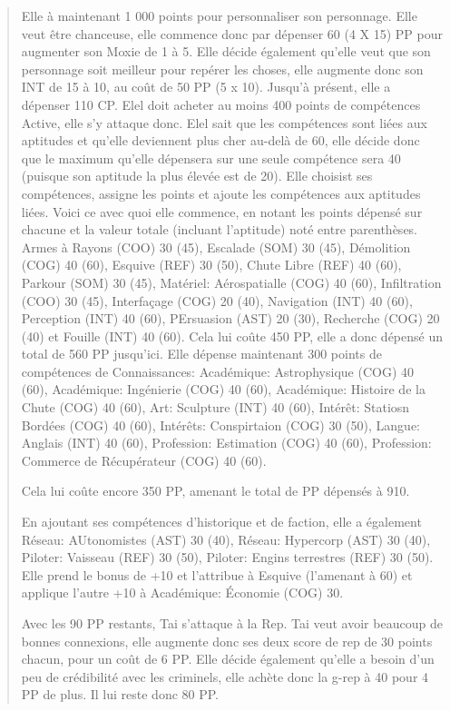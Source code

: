 \begin{quotation}
Elle à maintenant 1 000 points pour personnaliser son personnage. Elle veut être chanceuse, elle commence donc par dépenser 60 (4 X 15) PP pour augmenter son Moxie de 1 à 5. Elle décide également qu'elle veut que son personnage soit meilleur pour repérer les choses, elle augmente donc son INT de 15 à 10, au coût de 50 PP (5 x 10). Jusqu'à présent, elle a dépenser 110 CP. Elel doit acheter au moins 400 points de compétences Active, elle s'y attaque donc. Elel sait que les compétences sont liées aux aptitudes et qu'elle deviennent plus cher au-delà de 60, elle décide donc que le maximum qu'elle dépensera sur une seule compétence sera 40 (puisque son aptitude la plus élevée est de 20). Elle choisist ses compétences, assigne les points et ajoute les compétences aux aptitudes liées. Voici ce avec quoi elle commence, en notant les points dépensé sur chacune et la valeur totale (incluant l'aptitude) noté entre parenthèses. Armes à Rayons (COO) 30 (45), Escalade (SOM) 30 (45), Démolition (COG) 40 (60), Esquive (REF) 30 (50), Chute Libre (REF) 40 (60), Parkour (SOM) 30 (45), Matériel: Aérospatialle (COG) 40 (60), Infiltration (COO) 30 (45), Interfaçage (COG) 20 (40), Navigation (INT) 40 (60), Perception (INT) 40 (60), PErsuasion (AST) 20 (30), Recherche (COG) 20 (40) et Fouille (INT) 40 (60). Cela lui coûte 450 PP, elle a donc dépensé un total de 560 PP jusqu'ici. Elle dépense maintenant 300 points de compétences de Connaissances: Académique: Astrophysique (COG) 40 (60), Académique: Ingénierie (COG) 40 (60), Académique: Histoire de la Chute (COG) 40 (60), Art: Sculpture (INT) 40 (60), Intérêt: Statiosn Bordées (COG) 40 (60), Intérêts: Conspirtaion (COG) 30 (50), Langue: Anglais (INT) 40 (60), Profession: Estimation (COG) 40 (60), Profession: Commerce de Récupérateur (COG) 40 (60). 

Cela lui coûte encore 350 PP, amenant le total de PP dépensés à 910. 

En ajoutant ses compétences d'historique et de faction, elle a également Réseau: AUtonomistes (AST) 30 (40), Réseau: Hypercorp (AST) 30 (40), Piloter: Vaisseau (REF) 30 (50), Piloter: Engins terrestres (REF) 30 (50). Elle prend le bonus de +10 et l'attribue à Esquive (l'amenant à 60) et applique l'autre +10 à Académique: Économie (COG) 30. 

Avec les 90 PP restants, Tai s'attaque à la Rep. Tai veut avoir beaucoup de bonnes connexions, elle augmente donc ses deux score de rep de 30 points chacun, pour un coût de 6 PP. Elle décide également qu'elle a besoin d'un peu de crédibilité avec les criminels, elle achète donc la g-rep à 40 pour 4 PP de plus. Il lui reste donc 80 PP. 


\end{quotation}
